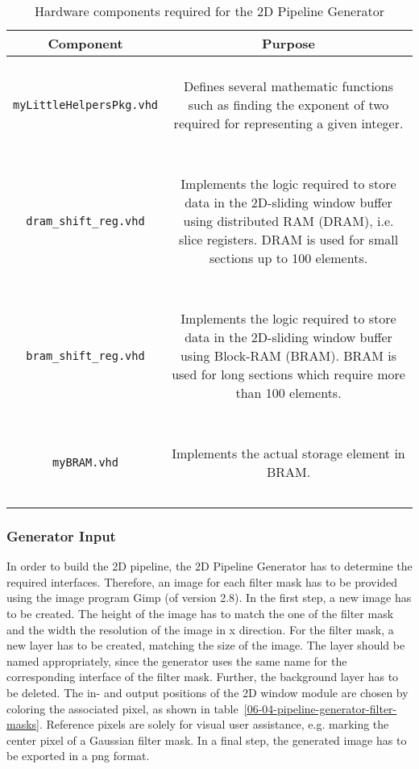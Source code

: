 \begin{longtable}[ht]{|c|c|}
\hline 
\textbf{Component} & \textbf{Purpose}\\
\hline 
\hline 
\endhead

\texttt{myLittleHelpersPkg.vhd} & 
\parbox{7cm}{ ~ \\ 
Defines several mathematic functions such as finding the exponent of two required for representing a given integer.
\\ ~ } \\

\hline 

\texttt{dram\_shift\_reg.vhd} & 
\parbox{7cm}{ ~ \\ 
Implements the logic required to store data in the 2D-sliding window buffer using distributed RAM (DRAM), i.e. slice registers. DRAM is used for small sections up to 100 elements.
\\ ~ } \\

\hline 

\texttt{bram\_shift\_reg.vhd} & 
\parbox{7cm}{~ \\ 
Implements the logic required to store data in the 2D-sliding window buffer using Block-RAM (BRAM). BRAM is used for long sections which require more than 100 elements.
\\ ~ } \\

\hline 

\texttt{myBRAM.vhd} & 
\parbox{7cm}{~ \\ 
Implements the actual storage element in BRAM.
\\ ~ } \\

\hline 

\caption{Hardware components required for the 2D Pipeline Generator} \label{06-04-pipeline-generator-components}\\
\end{longtable}

\subsubsection{Generator Input}
In order to build the 2D pipeline, the 2D Pipeline Generator has to determine the required interfaces.
Therefore, an image for each filter mask has to be provided using the image program Gimp (of version 2.8).
In the first step, a new image has to be created. 
The height of the image has to match the one of the filter mask and the width the resolution of the image in x direction.
For the filter mask, a new layer has to be created, matching the size of the image.
The layer should be named appropriately, since the generator uses the same name for the corresponding interface of the filter mask.
Further, the background layer has to be deleted.
The in- and output positions of the 2D window module are chosen by coloring the associated pixel, as shown in table~\ref{06-04-pipeline-generator-filter-masks}.
Reference pixels are solely for visual user assistance, e.g. marking the center pixel of a Gaussian filter mask.
In a final step, the generated image has to be exported in a png format.

